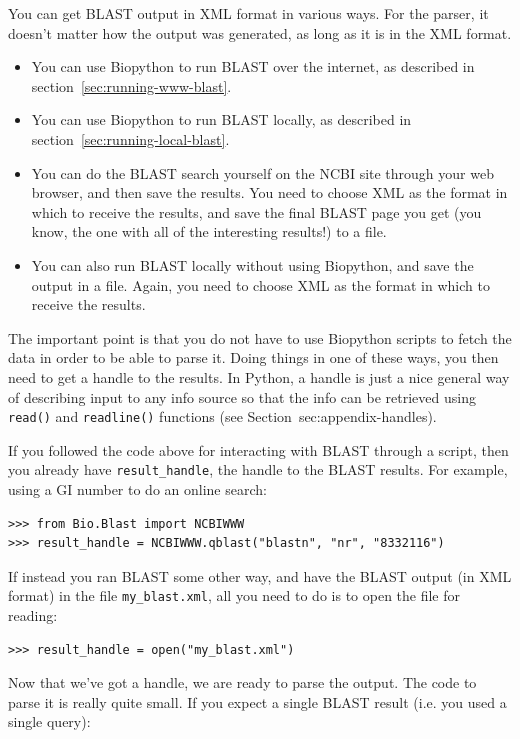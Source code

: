 \documentclass{report}
\begin{document}
You can get BLAST output in XML format in various ways. For the parser, it
doesn't matter how the output was generated, as long as it is in the XML format.
\begin{itemize}
\item You can use Biopython to run BLAST over the internet, as described in
section~\ref{sec:running-www-blast}.
\item You can use Biopython to run BLAST locally, as described in
section~\ref{sec:running-local-blast}.
\item You can do the BLAST search yourself on the NCBI site through your
web browser, and then save the results. You need to choose XML as the format
in which to receive the results, and save the final BLAST page you get
(you know, the one with all of the interesting results!) to a file.
\item You can also run BLAST locally without using Biopython, and save
the output in a file. Again, you need to choose XML as the format in which
to receive the results.
\end{itemize}
The important point is that you do not have to use Biopython
scripts to fetch the data in order to be able to parse it.
Doing things in one of these ways, you then need to get a handle
to the results. In Python, a handle is just a nice general way of
describing input to any info source so that the info can be retrieved
using \verb|read()| and \verb|readline()| functions
(see Section~{sec:appendix-handles}).

If you followed the code above for interacting with BLAST through a
script, then you already have \verb|result_handle|, the handle to the
BLAST results.  For example, using a GI number to do an online search:

\begin{verbatim}
>>> from Bio.Blast import NCBIWWW
>>> result_handle = NCBIWWW.qblast("blastn", "nr", "8332116")
\end{verbatim}

If instead you ran BLAST some other way, and have the
BLAST output (in XML format) in the file \verb|my_blast.xml|, all you
need to do is to open the file for reading:

\begin{verbatim}
>>> result_handle = open("my_blast.xml")
\end{verbatim}

Now that we've got a handle, we are ready to parse the output. The
code to parse it is really quite small.  If you expect a single
BLAST result (i.e. you used a single query):
\end{document}
